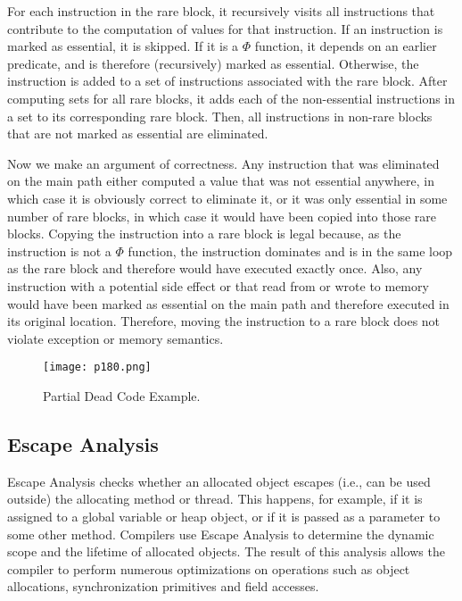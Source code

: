 For each instruction in the rare block, it recursively visits
all instructions that contribute to the computation of values
for that instruction. If an instruction is marked as essential,
it is skipped. If it is a $\Phi$ function, it depends on an earlier
predicate, and is therefore (recursively) marked as essential.
Otherwise, the instruction is added to a set of instructions
associated with the rare block.
After computing sets for all rare blocks, it adds each of the
non-essential instructions in a set to its corresponding rare
block. Then, all instructions in non-rare blocks that are not
marked as essential are eliminated.


Now we make an argument of correctness. Any instruction
that was eliminated on the main path either computed a
value that was not essential anywhere, in which case it is
obviously correct to eliminate it, or it was only essential in
some number of rare blocks, in which case it would have
been copied into those rare blocks. Copying the instruction
into a rare block is legal because, as the instruction is not a $\Phi$
function, the instruction dominates and is in the same loop
as the rare block and therefore would have executed exactly
once. Also, any instruction with a potential side effect or
that read from or wrote to memory would have been marked
as essential on the main path and therefore executed in its
original location. Therefore, moving the instruction to a
rare block does not violate exception or memory semantics.

\begin{figure}[H]
	\centering
	\texttt{[image: p180.png]}
	\caption{Partial Dead Code Example.}
	\label{fig:p180}
\end{figure}


\subsection{Escape Analysis\cite{stadler2014partial}}

Escape Analysis checks whether an allocated object escapes
(i.e., can be used outside) the allocating method or
thread. This happens, for example, if it is assigned to a
global variable or heap object, or if it is passed as a parameter
to some other method. Compilers use Escape Analysis
to determine the dynamic scope and the lifetime of allocated objects.
The result of this analysis allows the compiler to perform numerous
optimizations on operations such
as object allocations, synchronization primitives and field
accesses.



